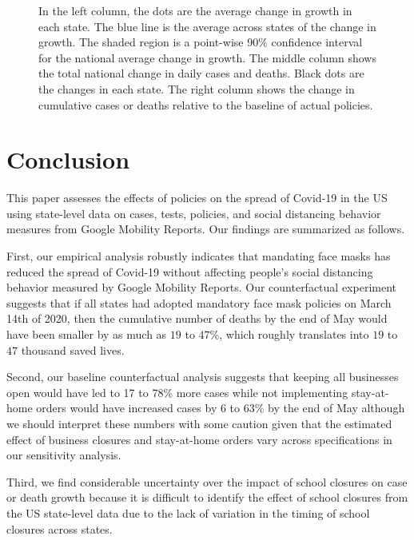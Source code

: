 \documentclass[11pt,reqno,letter]{amsart}
\theoremstyle{definition}
\begin{document}
\begin{figure}[ht]
\begin{minipage}{\linewidth}
    \begin{flushleft}
      \footnotesize In the left column, the dots are the average
      change in growth in each state. The blue line is the average
      across states of the change in growth. The shaded region is a
      point-wise 90\% confidence interval for the national average
      change in growth.  The middle column shows the total national
      change in daily cases and deaths. Black dots are the changes in each
      state.  The right column shows the change in cumulative cases or
      deaths relative to the baseline of actual policies.
    \end{flushleft}
  \end{minipage}
\end{figure}




\afterpage{\clearpage}

\section{Conclusion}


This paper assesses the effects of policies on the spread of Covid-19 in the US using state-level data on cases, tests, policies, and social distancing behavior measures from Google Mobility Reports. Our findings are summarized as follows.

First, our empirical analysis robustly indicates that mandating face masks has
reduced the spread of Covid-19 without affecting people's social
distancing behavior measured by Google Mobility Reports. Our
counterfactual experiment suggests that
if all states had  adopted mandatory face mask policies on March 14th of 2020, then the cumulative number of deaths by the end of May would have been smaller by as much as  $19$ to $47$\%, which roughly translates into $19$ to $47$  thousand saved lives.
  
Second, our baseline counterfactual analysis suggests that keeping all businesses open would have led to 17 to 78\% more cases  while not implementing stay-at-home orders would have increased cases by 6 to 63\% by the end of May although we should interpret these numbers with some caution given that the estimated effect of business closures and stay-at-home orders vary across specifications in our sensitivity analysis. 

Third, we find considerable uncertainty over  the impact of school closures on case or death growth because it is difficult to identify the effect of school closures from the US state-level data due to the lack of variation in the timing of school closures across states.
\end{document}
